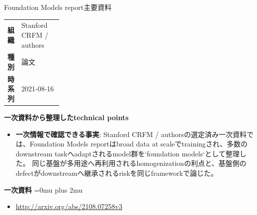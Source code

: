 \begin{technicalnote}{Foundation Models report}{主要資料}
\begingroup
\begin{tabularx}{\linewidth}{@{}>{\bfseries}p{0.22\linewidth}X@{}}
組織 & Stanford CRFM / authors \\
種別 & 論文 \\
時系列 & 2021-08-16 \\
\end{tabularx}
\smallskip
\begin{minipage}{\linewidth}
{\bfseries 一次資料から整理したtechnical points}
\begin{itemize}[leftmargin=1.5em,itemsep=0.35em]
\item \textbf{一次情報で確認できる事実}: Stanford CRFM / authorsの選定済み一次資料では、Foundation Models reportはbroad data at scaleでtrainingされ、多数のdownstream taskへadaptされるmodel群を`foundation models`として整理した。 同じ基盤が多用途へ再利用されるhomogenizationの利点と、基盤側のdefectがdownstreamへ継承されるriskを同じframeworkで論じた。
\end{itemize}
\begin{minipage}{\linewidth}
\begin{samepage}
{\bfseries 一次資料}
\begingroup\sloppy
\Urlmuskip=0mu plus 2mu\relax
\begin{itemize}[leftmargin=1.5em,itemsep=0.25em]
\item {\scriptsize\url{http://arxiv.org/abs/2108.07258v3}}
\end{itemize}
\endgroup
\end{samepage}
\end{minipage}
\end{minipage}
\endgroup
\end{technicalnote}
\medskip

